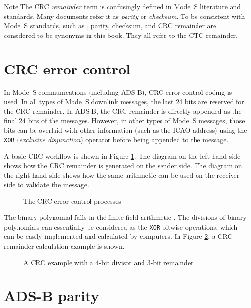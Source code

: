 \begin{notebox}{Note}
The CRC \emph{remainder} term is confusingly defined in Mode~S literature and standards. Many documents refer it as \emph{parity} or \emph{checksum}. To be consistent with Mode~S standards, such as \cite{icao9871v1, rtca2011mops}, parity, checksum, and CRC remainder are considered to be synonyms in this book. They all refer to the CTC remainder.
\end{notebox}

\section{CRC error control}

In Mode~S communications (including ADS-B), CRC error control coding is used. In all types of Mode~S downlink messages, the last 24 bits are reserved for the CRC remainder. In ADS-B, the CRC remainder is directly appended as the final 24 bits of the messages. However, in other types of Mode~S messages, those bits can be overlaid with other information (such as the ICAO address) using the \texttt{XOR} (\emph{exclusive disjunction}) operator before being appended to the message.

A basic CRC workflow is shown in Figure \ref{fig:crc_flow}. The diagram on the left-hand side shows how the CRC remainder is generated on the sender side. The diagram on the right-hand side shows how the same arithmetic can be used on the receiver side to validate the message.

\begin{figure}[ht]
  
  \caption{The CRC error control processes}
  \label{fig:crc_flow}
\end{figure}


The binary polynomial falls in the finite field arithmetic \cite{carlitz1932}. The divisions of binary polynomials can essentially be considered as the \texttt{XOR} bitwise operations, which can be easily implemented and calculated by computers. In Figure \ref{fig:crc_example}, a CRC remainder calculation example is shown.

\begin{figure}[ht]
  
  \caption{A CRC example with a 4-bit divisor and 3-bit remainder}
  \label{fig:crc_example}
\end{figure}


\section{ADS-B parity}

